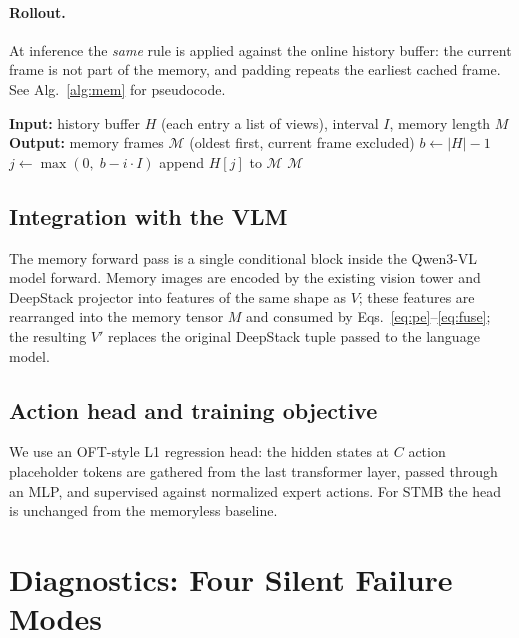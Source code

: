 \documentclass[11pt]{article}
\begin{document}
\paragraph{Rollout.} At inference the \emph{same} rule is applied against the
online history buffer: the current frame is not part of the memory, and padding
repeats the earliest cached frame. See Alg.~\ref{alg:mem} for pseudocode.

\begin{algorithm}[h]
\caption{Online memory construction at rollout step $b$}
\label{alg:mem}
\begin{algorithmic}[1]
\State \textbf{Input:} history buffer $H$ (each entry a list of views), interval $I$, memory length $M$
\State \textbf{Output:} memory frames $\mathcal{M}$ (oldest first, current frame excluded)
\State $b \gets |H| - 1$
    \State $j \gets \max(0,\; b - i \cdot I)$
    \State append $H[j]$ to $\mathcal{M}$
\EndFor
\State \Return $\mathcal{M}$
\end{algorithmic}
\end{algorithm}

\subsection{Integration with the VLM}

The memory forward pass is a single conditional block inside the Qwen3-VL model
forward. Memory images are encoded by the existing vision tower and DeepStack
projector into features of the same shape as $V$; these features are rearranged
into the memory tensor $M$ and consumed by Eqs.~\eqref{eq:pe}--\eqref{eq:fuse};
the resulting $V'$ replaces the original DeepStack tuple passed to the language
model.

\subsection{Action head and training objective}
We use an OFT-style L1 regression head: the hidden states at $C$ action
placeholder tokens are gathered from the last transformer layer, passed through
an MLP, and supervised against normalized expert actions. For STMB the head is
unchanged from the memoryless baseline.

\section{Diagnostics: Four Silent Failure Modes}
\label{sec:diagnostics}
\end{document}
